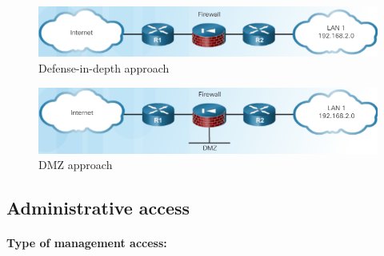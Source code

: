 \begin{figure}[hbtp]
\caption{Defense-in-depth approach}\label{DefInDepth}
\centering
\includegraphics[scale=0.6]{pictures/DefInDepth.PNG}
\end{figure}

\begin{figure}[hbtp]
\caption{DMZ approach}\label{DMZ}
\centering
\includegraphics[scale=0.5]{pictures/DMZ.PNG}
\end{figure}

%

\subsection{Administrative access}

\paragraph{Type of management access:} 

